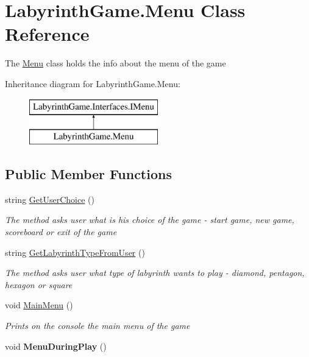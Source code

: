 \hypertarget{class_labyrinth_game_1_1_menu}{\section{Labyrinth\+Game.\+Menu Class Reference}
\label{class_labyrinth_game_1_1_menu}
}


The \hyperlink{class_labyrinth_game_1_1_menu}{Menu} class holds the info about the menu of the game  


Inheritance diagram for Labyrinth\+Game.\+Menu\+:\begin{figure}[H]
\begin{center}
\leavevmode
\includegraphics[height=2.000000cm]{class_labyrinth_game_1_1_menu}
\end{center}
\end{figure}
\subsection*{Public Member Functions}
\begin{DoxyCompactItemize}
\item 
string \hyperlink{class_labyrinth_game_1_1_menu_ad23587aa48dd1a0c0ce0774f25d1ca5b}{Get\+User\+Choice} ()
\begin{DoxyCompactList}\small\item\em The method asks user what is his choice of the game -\/ start game, new game, scoreboard or exit of the game \end{DoxyCompactList}\item 
string \hyperlink{class_labyrinth_game_1_1_menu_a48e4db8ff35a86dc421e013cbd986f5e}{Get\+Labyrinth\+Type\+From\+User} ()
\begin{DoxyCompactList}\small\item\em The method asks user what type of labyrinth wants to play -\/ diamond, pentagon, hexagon or square \end{DoxyCompactList}\item 
void \hyperlink{class_labyrinth_game_1_1_menu_ad1afd5a0a2a768cb8657b8f6a4aebda2}{Main\+Menu} ()
\begin{DoxyCompactList}\small\item\em Prints on the console the main menu of the game \end{DoxyCompactList}\item 
\hypertarget{class_labyrinth_game_1_1_menu_a30ae1129b472cba53f84ab34186b791b}{void {\bfseries Menu\+During\+Play} ()}\label{class_labyrinth_game_1_1_menu_a30ae1129b472cba53f84ab34186b791b}

\end{DoxyCompactItemize}



